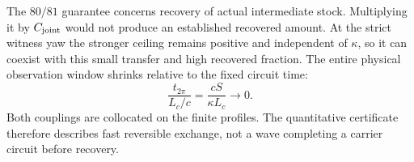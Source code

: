 The $80/81$ guarantee concerns recovery of actual intermediate stock. Multiplying it by $C_{\rm joint}$ would not produce an established recovered amount. At the strict witness yaw the stronger ceiling remains positive and independent of $\kappa$, so it can coexist with this small transfer and high recovered fraction. The entire physical observation window shrinks relative to the fixed circuit time:
\begin{equation}\label{eq:traveltime}%
\frac{t_{2\pi}}{L_c/c}=\frac{cS}{\kappa L_c}\longrightarrow0 .
\end{equation}
Both couplings are collocated on the finite profiles. The quantitative certificate therefore describes fast reversible exchange, not a wave completing a carrier circuit before recovery.
